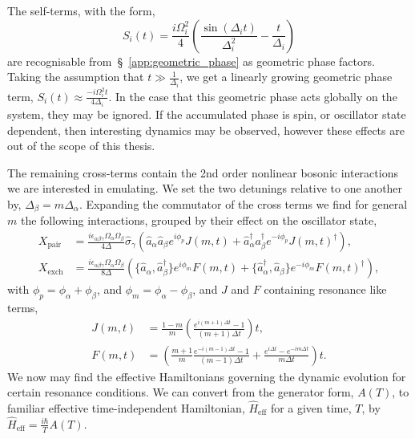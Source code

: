     The self-terms, with the form,
    \begin{equation}
        S_i(t) = \frac{i\Omega_i^2}{4}\left(\frac{\sin(\Delta_i t)}{\Delta_i^2} - \frac{t}{\Delta_i}\right)
    \end{equation}
    are recognisable from~\S~\ref{app:geometric_phase} as geometric phase factors.
    Taking the assumption that $t\gg \frac{1}{\Delta_i}$, we get a linearly growing geometric phase term,
    $S_i(t) \approx \frac{-i\Omega_i^2t}{4\Delta_i}$.
    In the case that this geometric phase acts globally on the
    system, they may be ignored. If the accumulated phase is spin, or oscillator
    state dependent, then interesting dynamics may be observed, however these
    effects are out of the scope of this thesis. 

    The remaining cross-terms contain the 2nd order nonlinear bosonic interactions we are interested in emulating. 
    We set the two detunings relative to one another by, $\Delta_\beta = m\Delta_\alpha$.
    Expanding the commutator of the cross terms we find for general $m$ the following interactions, grouped by their effect on the oscillator state,
    \begin{subequations}
    \begin{align}
        X_\mathrm{pair} &= \frac{i\epsilon_{\alpha\beta\gamma} \Omega_\alpha\Omega_\beta  }{4\Delta }\hat\sigma_\gamma \left(\hat a_\alpha\hat a_\beta e^{i\phi_p}J(m,t)+\hat a_\alpha^{\dagger}a_\beta^\dagger e^{-i\phi_p}J(m,t)^\dagger\right),\\
        X_\mathrm{exch} &= \frac{i\epsilon_{\alpha\beta\gamma}\Omega_\alpha\Omega_\beta }{8\Delta}\left(\{\hat a_\alpha, \hat a_\beta^\dagger\}e^{i\phi_m}F(m,t) + \{\hat a_\alpha^\dagger, \hat a_\beta \} e^{-i\phi_m}F(m,t)^\dagger\right),
    \end{align}
\end{subequations}
    with $\phi_p = \phi_\alpha + \phi_\beta$, and $\phi_m = \phi_\alpha - \phi_\beta$, and $J$ and $F$ containing resonance like terms,
    \begin{subequations}
    \begin{align}
        J(m,t) &=\frac{1-m}{m}\left(\frac{e^{i(m+1)\Delta t}-1}{(m+1)\Delta t}\right)t,\\
        F(m,t) &= \left(\frac{m+1}{m}\frac{e^{-i (m-1)\Delta t}-1}{(m-1)\Delta t} + \frac{e^{i\Delta t}-e^{-im\Delta t}}{m\Delta t}\right)t.
    \end{align}
\end{subequations}
    We now may find the effective Hamiltonians governing the dynamic evolution for certain resonance conditions.
    We can convert from the generator form, $A(T)$, to familiar effective 
    time-independent Hamiltonian, $\hat H_\mathrm{eff}$ for a given time, $T$, by $\hat H_\mathrm{eff} = \frac{i\hbar}{T}A(T)$.

